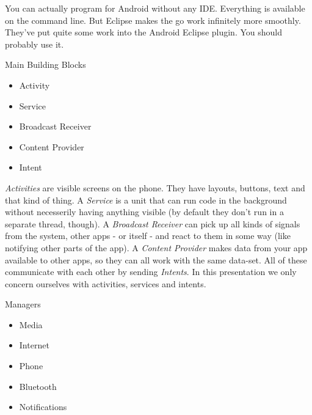 \documentclass[a4paper,slides=slides,handouts=handouts]{mh-presentation}       %
\begin{document}
	\begin{summary}
		You can actually program for Android without any IDE. Everything is available on the
		command line. But Eclipse makes the go work infinitely more smoothly. They've put
		quite some work into the Android Eclipse plugin. You should probably use it. 
	\end{summary}
	
	\begin{slide}
		\huge
		\begin{block}{Main Building Blocks}
			\begin{itemize}
			  \item<1-> Activity
			  \item<2-> Service
			  \item<3-> Broadcast Receiver
			  \item<4-> Content Provider
			  \item<5-> Intent
			\end{itemize}
		\end{block}
	\end{slide}
	
	\begin{summary}[5]


		\emph{Activities} are visible screens on the phone. They have layouts, buttons, text
		and that kind of thing. A \emph{Service} is a unit that can run code in the background
		without necesserily having anything visible (by default they don't run in a separate
		thread, though). A \emph{Broadcast Receiver} can pick up all kinds of signals from the
		system, other apps - or itself - and react to them in some way (like notifying other
		parts of the app). A \emph{Content Provider} makes data from your app available to other
		apps, so they can all work with the same data-set. All of these communicate with each
		other by sending \emph{Intents}. In this presentation we only concern ourselves with
		activities, services and intents.
	\end{summary}
	
	\begin{slide}
		\huge
		\begin{block}{Managers}
			\begin{itemize}
			  \item<1-> Media
			  \item<2-> Internet
			  \item<3-> Phone
			  \item<4-> Bluetooth
			  \item<5-> Notifications
			\end{itemize}
		\end{block}
	\end{slide}
	
\end{document}
